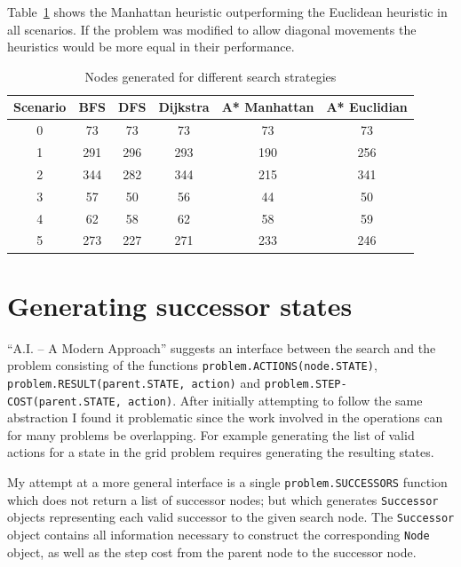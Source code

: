 Table~\ref{table:vi_generated_nodes} shows the Manhattan heuristic outperforming the Euclidean heuristic in all scenarios. If the problem was modified to allow diagonal movements the heuristics would be more equal in their performance.

\begin{table}
\centering
\begin{tabular}{c|ccccc}
Scenario & BFS & DFS & Dijkstra & A* Manhattan & A* Euclidian \\
\hline
0        &  73 &  73 &       73 &           73 &           73 \\
1        & 291 & 296 &      293 &          190 &          256 \\
2        & 344 & 282 &      344 &          215 &          341 \\
3        &  57 &  50 &       56 &           44 &           50 \\
4        &  62 &  58 &       62 &           58 &           59 \\
5        & 273 & 227 &      271 &          233 &          246 \\
\end{tabular}
\caption{Nodes generated for different search strategies}
\label{table:vi_generated_nodes}
\end{table}

\section*{Generating successor states}

``A.I. -- A Modern Approach'' suggests an interface between the search and the problem consisting of the functions \texttt{problem.ACTIONS(node.STATE)}, \texttt{problem.RESULT(parent.STATE, action)} and \texttt{problem.STEP-COST(parent.STATE, action)}. After initially attempting to follow the same abstraction I found it problematic since the work involved in the operations can for many problems be overlapping. For example generating the list of valid actions for a state in the grid problem requires generating the resulting states.

My attempt at a more general interface is a single \texttt{problem.SUCCESSORS} function which does not return a list of successor nodes; but which generates \texttt{Successor} objects representing each valid successor to the given search node. The \texttt{Successor} object contains all information necessary to construct the corresponding \texttt{Node} object, as well as the step cost from the parent node to the successor node.

